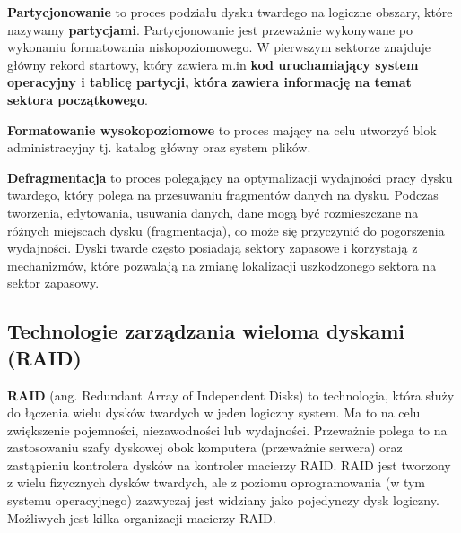 \documentclass{article}
\begin{document}
\textbf{Partycjonowanie} to proces podziału dysku twardego na logiczne obszary, które nazywamy \textbf{partycjami}. Partycjonowanie jest przeważnie wykonywane po wykonaniu formatowania niskopoziomowego. W pierwszym sektorze znajduje główny rekord startowy, który zawiera m.in \textbf{kod uruchamiający system operacyjny i tablicę partycji, która zawiera informację na temat sektora początkowego}.

\textbf{Formatowanie wysokopoziomowe} to proces mający na celu utworzyć blok administracyjny tj. katalog główny oraz system plików.

\textbf{Defragmentacja} to proces polegający na optymalizacji wydajności pracy dysku twardego, który polega na przesuwaniu fragmentów danych na dysku. Podczas tworzenia, edytowania, usuwania danych, dane mogą być rozmieszczane na różnych miejscach dysku (fragmentacja), co może się przyczynić do pogorszenia wydajności. Dyski twarde często posiadają sektory zapasowe i korzystają z mechanizmów, które pozwalają na zmianę lokalizacji uszkodzonego sektora na sektor zapasowy.

\subsection{Technologie zarządzania wieloma dyskami (RAID)}
\textbf{RAID} (ang. Redundant Array of Independent Disks) to technologia, która służy do łączenia wielu dysków twardych w jeden logiczny system. Ma to na celu zwiększenie pojemności, niezawodności lub wydajności. Przeważnie polega to na zastosowaniu szafy dyskowej obok komputera (przeważnie serwera) oraz zastąpieniu kontrolera dysków na kontroler macierzy RAID. RAID jest tworzony z wielu fizycznych dysków twardych, ale z poziomu oprogramowania (w tym systemu operacyjnego) zazwyczaj jest widziany jako pojedynczy dysk logiczny. Możliwych jest kilka organizacji macierzy RAID.
\end{document}
